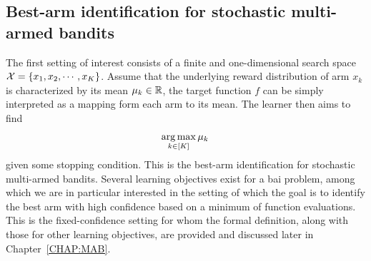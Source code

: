 
\subsection{Best-arm identification for stochastic multi-armed bandits}\label{sec:intro.mab.bai}

The first setting of interest consists of a finite and one-dimensional search space $\mathcal{X} = \{x_1,x_2,\cdots,x_K\}$. Assume that the underlying reward distribution of arm $x_k$ is characterized by its mean $\mu_k\in\mathbb{R}$, the target function $f$ can be simply interpreted as a mapping form each arm to its mean. The learner then aims to find
\begin{align}\label{eq:optim_bai}
    \operatorname*{arg\,max}_{k\in[K]} \mu_k\,
\end{align}
given some stopping condition. This is the best-arm identification for stochastic multi-armed bandits. Several learning objectives exist for a \gls{bai} problem, among which we are in particular interested in the setting of which the goal is to identify the best arm with high confidence based on a minimum of function evaluations. This is the \gls{fixed-confidence setting} for whom the formal definition, along with those for other learning objectives, are provided and discussed later in Chapter~\ref{CHAP:MAB}.

